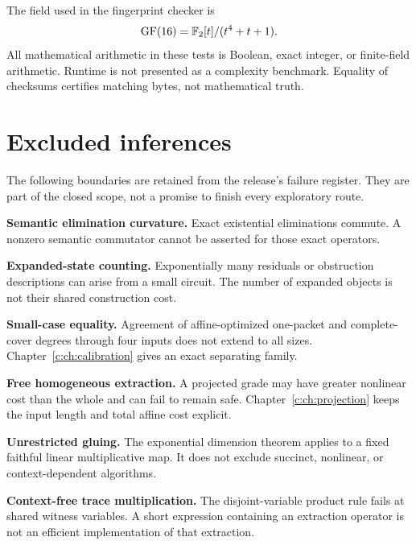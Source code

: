 The field used in the fingerprint checker is
\[
 \mathrm{GF}(16)=\mathbb F_2[t]/(t^4+t+1).
\]
All mathematical arithmetic in these tests is Boolean, exact integer, or finite-field arithmetic. Runtime is not presented as a complexity benchmark. Equality of checksums certifies matching bytes, not mathematical truth.



\section{Excluded inferences}
The following boundaries are retained from the release's failure register. They are part of the closed scope, not a promise to finish every exploratory route.

\textbf{Semantic elimination curvature.} Exact existential eliminations commute. A nonzero semantic commutator cannot be asserted for those exact operators.

\textbf{Expanded-state counting.} Exponentially many residuals or obstruction descriptions can arise from a small circuit. The number of expanded objects is not their shared construction cost.

\textbf{Small-case equality.} Agreement of affine-optimized one-packet and complete-cover degrees through four inputs does not extend to all sizes. Chapter~\ref{c:ch:calibration} gives an exact separating family.

\textbf{Free homogeneous extraction.} A projected grade may have greater nonlinear cost than the whole and can fail to remain safe. Chapter~\ref{c:ch:projection} keeps the input length and total affine cost explicit.

\textbf{Unrestricted gluing.} The exponential dimension theorem applies to a fixed faithful linear multiplicative map. It does not exclude succinct, nonlinear, or context-dependent algorithms.

\textbf{Context-free trace multiplication.} The disjoint-variable product rule fails at shared witness variables. A short expression containing an extraction operator is not an efficient implementation of that extraction.

